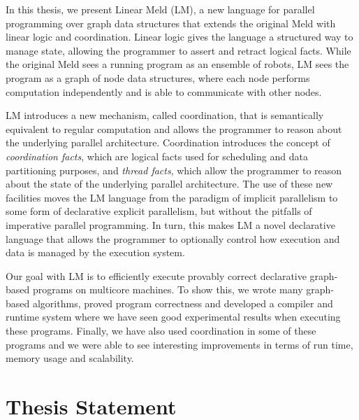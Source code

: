 In this thesis, we present Linear Meld (LM), a new language for parallel
programming over graph data structures that extends the original Meld with
linear logic and coordination. Linear logic gives the language a structured way
to manage state, allowing the programmer to assert and retract logical facts.
While the original Meld sees a running program as an ensemble of robots, LM sees
the program as a graph of node data structures, where each node performs
computation independently and is able to communicate with other nodes.

LM introduces a new mechanism, called coordination, that is semantically
equivalent to regular computation and allows the programmer to reason about the
underlying parallel architecture. Coordination introduces the concept of
\emph{coordination facts}, which are logical facts used for scheduling and data
partitioning purposes, and \emph{thread facts}, which allow the programmer to
reason about the state of the underlying parallel architecture. The use of these
new facilities moves the LM language from the paradigm of implicit parallelism
to some form of declarative explicit parallelism, but without the pitfalls of
imperative parallel programming. In turn, this makes LM a novel declarative
language that allows the programmer to optionally control how execution and data
is managed by the execution system.

Our goal with LM is to efficiently execute provably correct declarative
graph-based programs on multicore machines. To show this, we wrote many
graph-based algorithms, proved program correctness and developed a compiler and
runtime system where we have seen good experimental results when executing these
programs. Finally, we have also used coordination in some of these programs and
we were able to see interesting improvements in terms of run time, memory usage
and scalability.

\section{Thesis Statement}



